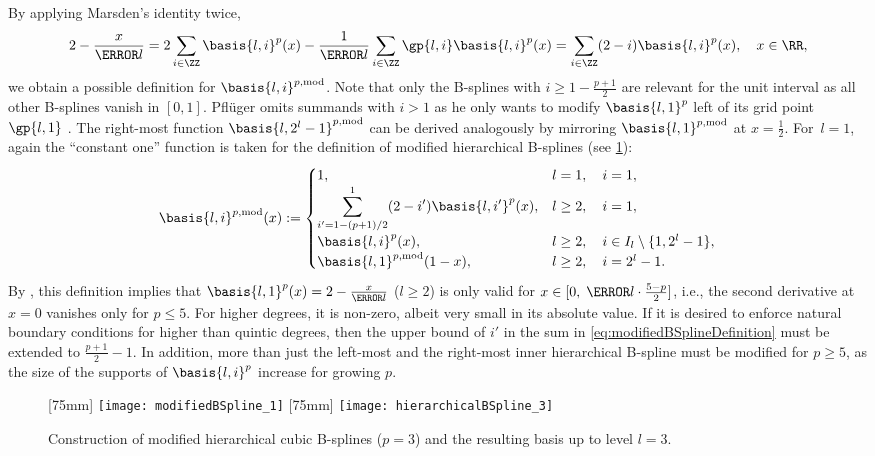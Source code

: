 By applying Marsden's identity twice,
\begin{equation}
  \label{eq:modifiedBSplineConstruction}
  2 - \frac{x}{\ms{l}}
  = 2 \sum_{i \in \ZZ} \basis{l,i}^p(x)
  - \frac{1}{\ms{l}} \sum_{i \in \ZZ} \gp{l,i} \basis{l,i}^p(x)
  = \sum_{i \in \ZZ} (2 - i) \basis{l,i}^p(x),\quad
  x \in \RR,
\end{equation}
we obtain a possible definition for $\basis{l,i}^{p,\modified}$.
Note that only the B-splines with $i \ge 1 - \tfrac{p+1}{2}$
are relevant for the unit interval as all other B-splines vanish in $[0, 1]$.
Pflüger omits summands with $i > 1$ as he only wants to modify
$\basis{l,1}^p$ left of its grid point $\gp{l,1}$ \cite{Pflueger10Spatially}.
The right-most function $\basis{l,2^l-1}^{p,\modified}$ can be derived
analogously by mirroring $\basis{l,1}^{p,\modified}$ at $x = \tfrac{1}{2}$.
For~$l = 1$, again the ``constant one'' function is taken for the definition
of modified hierarchical B-splines (see \cref{fig:modifiedBSpline}):
\begin{equation}
  \label{eq:modifiedBSplineDefinition}
  \basis{l,i}^{p,\modified}(x)
  :=
  \begin{cases}
    1,&
    l = 1,\quad i = 1,\\
    \displaystyle\sum_{i'=1-(p+1)/2}^1 (2 - i') \basis{l,i'}^p(x),&
    l \ge 2,\quad i = 1,\\
    \basis{l,i}^p(x),&
    l \ge 2,\quad i \in I_l \setminus \{1, 2^l - 1\},\\
    \basis{l,1}^{p,\modified}(1 - x),&
    l \ge 2,\quad i = 2^l - 1.
  \end{cases}
\end{equation}
By ,
this definition implies that
$\basis{l,1}^p(x) = 2 - \tfrac{x}{\ms{l}}$ ($l \ge 2$)
is only valid for $x \in [0,\; \ms{l} \cdot \tfrac{5-p}{2}]$, i.e.,
the second derivative at $x = 0$ vanishes only for $p \le 5$.
For higher degrees, it is non-zero, albeit very small
in its absolute value.
If it is desired to enforce natural boundary conditions
for higher than quintic degrees,
then the upper bound of $i'$ in the sum in \eqref{eq:modifiedBSplineDefinition}
must be extended to $\tfrac{p+1}{2} - 1$.
In addition, more than just the left-most and the right-most inner
hierarchical B-spline must be modified for $p \ge 5$,
as the size of the supports of $\basis{l,i}^p$ increase
for growing $p$.

\begin{figure}
  [75mm]{%
    \texttt{[image: modifiedBSpline\_1]}%
  }%
  \hfill%
  [75mm]{%
    \texttt{[image: hierarchicalBSpline\_3]}%
  }%
  \caption{%
    Construction of modified hierarchical cubic B-splines ($p = 3$) and
    the resulting basis up to level $l = 3$.%
  }
  \label{fig:modifiedBSpline}
\end{figure}




